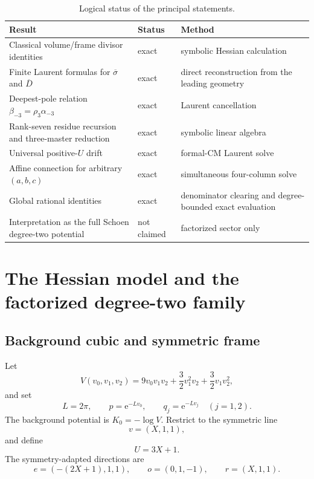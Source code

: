 \documentclass[11pt]{article}
\theoremstyle{definition}
\theoremstyle{remark}
\newcommand{\e}{\mathrm{e}}
\newcommand{\bsigma}{\overline{\sigma}}
\newcommand{\bD}{\overline{D}}
\begin{document}
\begin{table}[ht]
\centering
\small
\begin{tabular}{p{}p{}p{}}
\toprule
Result & Status & Method \\
\midrule
Classical volume/frame divisor identities & exact & symbolic Hessian calculation \\
Finite Laurent formulas for $\bsigma$ and $\bD$ & exact & direct reconstruction from the leading geometry \\
Deepest-pole relation $\beta_{-3}=\rho_3\alpha_{-3}$ & exact & Laurent cancellation \\
Rank-seven residue recursion and three-master reduction & exact & symbolic linear algebra \\
Universal positive-$U$ drift & exact & formal-CM Laurent solve \\
Affine connection for arbitrary $(a,b,c)$ & exact & simultaneous four-column solve \\
Global rational identities & exact & denominator clearing and degree-bounded exact evaluation \\
Interpretation as the full Schoen degree-two potential & not claimed & factorized sector only \\
\bottomrule
\end{tabular}
\caption{Logical status of the principal statements.}
\label{tab:status}
\end{table}

\section{The Hessian model and the factorized degree-two family}

\subsection{Background cubic and symmetric frame}

Let
\begin{equation}\label{eq:V}
 V(v_0,v_1,v_2)
 =9v_0v_1v_2+\frac32v_1^2v_2+\frac32v_1v_2^2,
\end{equation}
and set
\begin{equation}\label{eq:Lpq}
 L=2\pi,
 \qquad p=\e^{-Lv_0},
 \qquad q_j=\e^{-Lv_j}\quad(j=1,2).
\end{equation}
The background potential is $K_0=-\log V$.  Restrict to the symmetric line
\begin{equation}\label{eq:symmetricline}
 v=(X,1,1),
\end{equation}
and define
\begin{equation}\label{eq:Udef}
 U=3X+1.
\end{equation}
The symmetry-adapted directions are
\begin{equation}\label{eq:frame}
 e=(-(2X+1),1,1),
 \qquad o=(0,1,-1),
 \qquad r=(X,1,1).
\end{equation}
\end{document}
